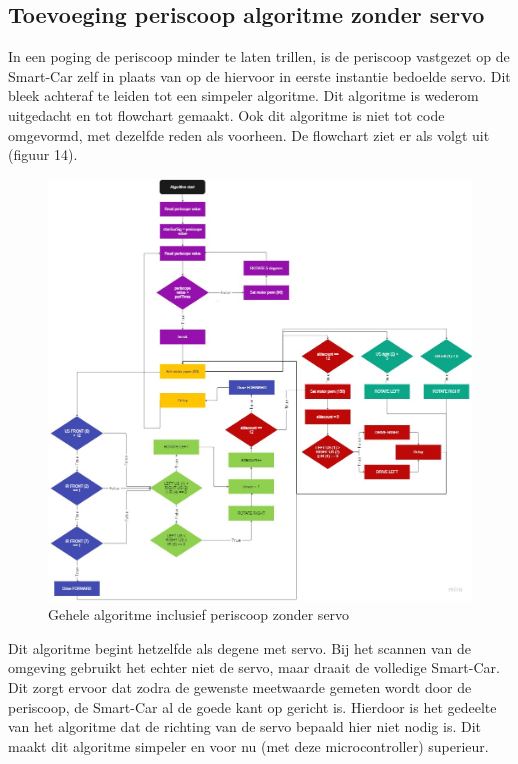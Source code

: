 \subsection{Toevoeging periscoop algoritme zonder servo}
In een poging de periscoop minder te laten trillen, is de periscoop vastgezet op de \gls{Smart-Car} zelf in plaats van op de hiervoor in eerste instantie bedoelde servo. Dit bleek achteraf te leiden tot een simpeler algoritme. Dit algoritme is wederom uitgedacht en tot flowchart gemaakt. Ook dit algoritme is niet tot code omgevormd, met dezelfde reden als voorheen. De flowchart ziet er als volgt uit (figuur 14).

\begin{figure}[h]
    \centering
    \includegraphics[scale = 0.5]{Media/Figuren/Periscoop algoritme zonder servo.jpg}
    \caption{Gehele algoritme inclusief periscoop zonder servo}
    \label{Volledig algoritme met periscoop, zonder servo}
\end{figure}

Dit algoritme begint hetzelfde als degene met servo. Bij het scannen van de omgeving gebruikt het echter niet de servo, maar draait de volledige \gls{Smart-Car}. Dit zorgt ervoor dat zodra de gewenste meetwaarde gemeten wordt door de periscoop, de \gls{Smart-Car} al de goede kant op gericht is. Hierdoor is het gedeelte van het algoritme dat de richting van de servo bepaald hier niet nodig is. Dit maakt dit algoritme simpeler en voor nu (met deze microcontroller) superieur.